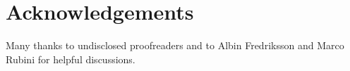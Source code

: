 

%
%
%

\section*{Acknowledgements}

Many thanks to undisclosed proofreaders and to 
Albin Fredriksson and Marco Rubini for helpful discussions.


\renewcommand{\bibname}{References}



